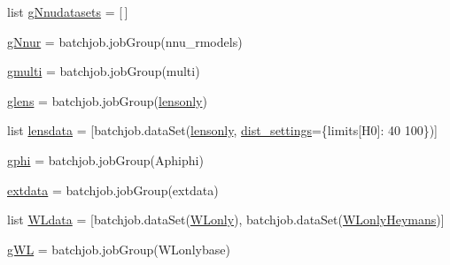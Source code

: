 \begin{DoxyCompactItemize}
\item 
list \mbox{\hyperlink{namespaceplanck_1_1settings__planck__2015_aee51cde72cfc3083392d1c53e90e4846}{g\+Nnudatasets}} = \mbox{[}$\,$\mbox{]}
\item 
\mbox{\hyperlink{namespaceplanck_1_1settings__planck__2015_a97f00808776d90fe95e56f4e7535f374}{g\+Nnur}} = batchjob.\+job\+Group(\textquotesingle{}nnu\+\_\+rmodels\textquotesingle{})
\item 
\mbox{\hyperlink{namespaceplanck_1_1settings__planck__2015_a3639a00b40960dcc61ace6dddb79f682}{gmulti}} = batchjob.\+job\+Group(\textquotesingle{}multi\textquotesingle{})
\item 
\mbox{\hyperlink{namespaceplanck_1_1settings__planck__2015_a31a423a193c47295777adec458aec871}{glens}} = batchjob.\+job\+Group(\textquotesingle{}\mbox{\hyperlink{namespaceplanck_1_1settings__planck__2015_ae18f99e2ee5bb1edb40d2fff4be0ef68}{lensonly}}\textquotesingle{})
\item 
list \mbox{\hyperlink{namespaceplanck_1_1settings__planck__2015_a69a053bc05ff40f3649b9ea1df68bf81}{lensdata}} = \mbox{[}batchjob.\+data\+Set(\mbox{\hyperlink{namespaceplanck_1_1settings__planck__2015_ae18f99e2ee5bb1edb40d2fff4be0ef68}{lensonly}}, \mbox{\hyperlink{namespaceplanck_1_1settings__planck__2015_a168acdeb73e627d1f1dcf9e11ba082b1}{dist\+\_\+settings}}=\{\textquotesingle{}limits\mbox{[}H0\mbox{]}\textquotesingle{}\+: \textquotesingle{}40 100\textquotesingle{}\})\mbox{]}
\item 
\mbox{\hyperlink{namespaceplanck_1_1settings__planck__2015_a71fa24288af55b6952b710d0e14d94dd}{gphi}} = batchjob.\+job\+Group(\textquotesingle{}Aphiphi\textquotesingle{})
\item 
\mbox{\hyperlink{namespaceplanck_1_1settings__planck__2015_ad49cad5fa3dc2b332592ab2697b3299a}{extdata}} = batchjob.\+job\+Group(\textquotesingle{}extdata\textquotesingle{})
\item 
list \mbox{\hyperlink{namespaceplanck_1_1settings__planck__2015_a84c19808eb37bd2298044188fb57b85c}{W\+Ldata}} = \mbox{[}batchjob.\+data\+Set(\mbox{\hyperlink{namespaceplanck_1_1settings__planck__2015_a4a0dbeb7aaf6fe5d901ed83b6e9a5d9f}{W\+Lonly}}), batchjob.\+data\+Set(\mbox{\hyperlink{namespaceplanck_1_1settings__planck__2015_aff189da87d173397cc11341e11460b3f}{W\+Lonly\+Heymans}})\mbox{]}
\item 
\mbox{\hyperlink{namespaceplanck_1_1settings__planck__2015_a513fb57eec063512b6ea7e44bba75671}{g\+WL}} = batchjob.\+job\+Group(\textquotesingle{}W\+Lonlybase\textquotesingle{})
\item 

\end{DoxyCompactItemize}
